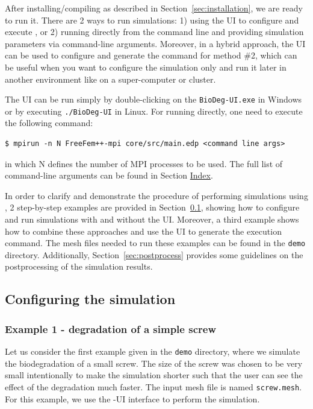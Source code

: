 After installing/compiling \biodeg{} as described in Section~\ref{sec:installation}, we are ready to run it. There are 2 ways to run \biodeg{} simulations: 1) using the UI to configure and execute \biodeg{}, or 2) running \biodeg{} directly from the command line and providing simulation parameters via command-line arguments. Moreover, in a hybrid approach, the UI can be used to configure and generate the command for method \#2, which can be useful when you want to configure the simulation only and run it later in another environment like on a super-computer or cluster.

The UI can be run simply by double-clicking on the \verb|BioDeg-UI.exe| in Windows or by executing \verb|./BioDeg-UI| in Linux. For running \biodeg{} directly, one need to execute the following command:
\begin{verbatim}
$ mpirun -n N FreeFem++-mpi core/src/main.edp <command line args>
\end{verbatim}
in which N defines the number of MPI processes to be used. The full list of command-line arguments can be found in Section \hyperref[sec:index]{Index}.

In order to clarify and demonstrate the procedure of performing simulations using \biodeg{}, 2 step-by-step examples are provided in Section~\ref{sec:config}, showing how to configure and run simulations with and without the UI. Moreover, a third example shows how to combine these approaches and use the UI to generate the execution command. The mesh files needed to run these examples can be found in the \verb|demo| directory. Additionally, Section~\ref{sec:postprocess} provides some guidelines on the postprocessing of the  \biodeg{} simulation results. 

\subsection{Configuring the simulation} \label{sec:config}


\subsubsection{Example 1 - degradation of a simple screw}\label{sec:example1}

Let us consider the first example given in the \verb|demo| directory, where we simulate the biodegradation of a small screw. The size of the screw was chosen to be very small intentionally to make the simulation shorter such that the user can see the effect of the degradation much faster. The input mesh file is named \verb|screw.mesh|. For this example, we use the \biodeg{}-UI interface to perform the simulation. 

